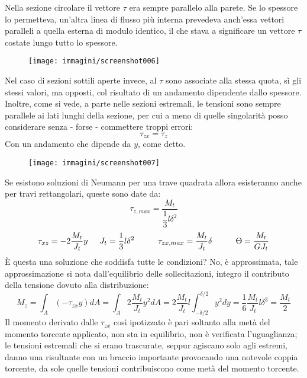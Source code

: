 \documentclass{article}
\begin{document}
\begin{adjustwidth}{2in}{}
		
			 Nella sezione circolare il vettore $\tau$ era sempre parallelo alla parete. Se lo spessore lo permetteva, un'altra linea di flusso più interna prevedeva anch'essa vettori paralleli a quella esterna di modulo identico, il che stava a significare un vettore $\tau$ costate lungo tutto lo spessore.  
			 
			 \begin{figure}[H]
			 	\centering
			 	\texttt{[image: immagini/screenshot006]}
			 	\label{fig:screenshot006}
			 \end{figure}
			 
			 Nel caso di sezioni sottili aperte invece, al $\tau$ sono associate alla stessa quota, sì gli stessi valori, ma opposti, col risultato di un andamento dipendente dallo spessore. Inoltre, come si vede, a parte nelle sezioni estremali, le tensioni sono sempre parallele ai lati lunghi della sezione, per cui a meno di quelle singolarità posso considerare senza - forse - commettere troppi errori:
			 \[ \tau_{zx} = \tau_z\]
			 Con un andamento che dipende da $y$, come detto. 
			 
\begin{figure}[H]
	\centering
	\texttt{[image: immagini/screenshot007]}
	\label{fig:screenshot007}
\end{figure}

			Se esistono soluzioni di Neumann per una trave quadrata allora esisteranno anche per travi rettangolari, queste sono date da:
			\begin{equation} 
				\label{taumax}
				\tau_{z, max} = \dfrac{M_t}{\dfrac{1}{3}l\delta^2} 
			\end{equation}
			\[ \tau_{xz} = -2\dfrac{M_t}{J_t}y \hspace{0.5cm} J_t = \dfrac{1}{3}l\delta^2 \hspace{1cm} \tau_{zx, max} = \dfrac{M_t}{J_t}\delta \hspace{1cm} \Theta = \dfrac{M_t}{GJ_t} \]
			È questa una soluzione che soddisfa tutte le condizioni? No, è approssimata, tale approssimazione si nota dall'equilibrio delle sollecitazioni, integro il contributo della tensione dovuto alla distribuzione:
			\[ M_z = \int_A(-\tau_{zx}y)dA = \int_A2\dfrac{M_t}{J_t}y^2dA =2\dfrac{M_t}{J_t}l\int_{-\delta/2}^{\delta/2}y^2dy = \dfrac{1}{6}\dfrac{M_t}{J_t}l\delta^3 = \dfrac{M_t}{2}  \]
			Il momento derivato dalle $\tau_{zx}$ così ipotizzato è pari soltanto alla metà del momento torcente applicato, non sta in equilibrio, non è verificata l'uguaglianza; le tensioni estremali che si erano trascurate, seppur agiscano solo agli estremi, danno una risultante con un braccio importante provocando una notevole coppia torcente, da sole quelle tensioni contribuiscono come metà del momento torcente. 
			

\end{adjustwidth}
\end{document}
